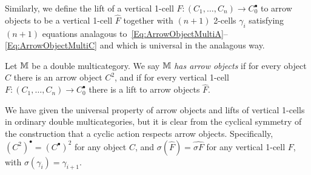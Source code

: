 Similarly, we define the lift of a vertical 1-cell $F\colon(C_1,\dots,C_n)\to C_0^{\bullet}$ to arrow objects to be a vertical 1-cell $\hat{F}$ together with $(n+1)$ 2-cells $\gamma_i$ satisfying $(n+1)$ equations analagous to~\eqref{Eq:ArrowObjectMultiA}--\eqref{Eq:ArrowObjectMultiC} and which is universal in the analagous way.

\begin{definition}
	Let $\mathbb{M}$ be a double multicategory. We say $\mathbb{M}$ \emph{has arrow objects} if for every object $C$ there is an arrow object $C^2$, and if for every vertical 1-cell $F\colon(C_1,\dots,C_n)\to C_0^{\bullet}$ there is a lift to arrow objects $\hat{F}$.
\end{definition}

We have given the universal property of arrow objects and lifts of vertical 1-cells in ordinary double multicategories, but it is clear from the cyclical symmetry of the construction that a cyclic action respects arrow objects. Specifically, $(C^2)^{\bullet}=(C^{\bullet})^2$ for any object $C$, and $\sigma(\hat{F})=\widehat{\sigma F}$ for any vertical 1-cell $F$, with $\sigma(\gamma_i)=\gamma_{i+1}$.